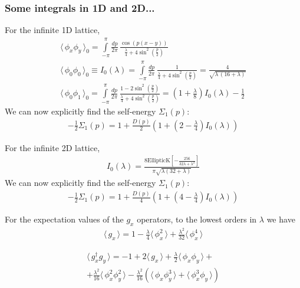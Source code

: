 \documentclass[12pt]{article}
\newcommand{\lr}[1]{ \left( #1 \right) }
\newcommand{\vev}[1]{ \langle \, #1 \, \rangle }
\begin{document}
\subsubsection{Some integrals in 1D and 2D...}

For the infinite 1D lattice,
\begin{eqnarray}
\label{phixphiy0}
 \vev{\phi_x \phi_y}_0 = \int\limits_{-\pi}^{\pi} \frac{d p}{2 \pi} \, \frac{\cos\lr{p\lr{x - y}}}{\frac{\lambda}{4} + 4 \sin^2\lr{\frac{p}{2}}}
 \nonumber \\
 \vev{\phi_0 \phi_0}_0 \equiv I_0\lr{\lambda} =  \int\limits_{-\pi}^{\pi} \frac{d p}{2 \pi} \, \frac{1}{\frac{\lambda}{4} + 4 \sin^2\lr{\frac{p}{2}}} = \frac{4}{\sqrt{\lambda \, \lr{16 + \lambda}}}
 \nonumber \\
 \vev{\phi_0 \phi_1}_0 =  \int\limits_{-\pi}^{\pi} \frac{d p}{2 \pi} \, \frac{1 - 2 \sin^2\lr{\frac{p}{2}}}{\frac{\lambda}{4} + 4 \sin^2\lr{\frac{p}{2}}} =
 \lr{1 + \frac{\lambda}{8}} I_0\lr{\lambda} - \frac{1}{2}
\end{eqnarray}
We can now explicitly find the self-energy $\Sigma_1\lr{p}$:
\begin{eqnarray}
\label{sigma1p}
 -\frac{1}{2} \Sigma_1\lr{p}
 =
 1 + \frac{D\lr{p}}{2}\lr{1 + \lr{2 - \frac{\lambda}{4}} I_0\lr{\lambda} }
\end{eqnarray}

For the infinite 2D lattice,
\begin{eqnarray}
\label{I0_2D}
 I_0\lr{\lambda} = \frac{8 \text{EllipticK}\left[-\frac{256}{32 \lambda +\lambda ^2}\right]}{\pi  \sqrt{\lambda  (32+\lambda )}}
\end{eqnarray}
We can now explicitly find the self-energy $\Sigma_1\lr{p}$:
\begin{eqnarray}
\label{sigma1p}
 -\frac{1}{2} \Sigma_1\lr{p}
 =
 1 + \frac{D\lr{p}}{4}\lr{1 + \lr{4 - \frac{\lambda}{4}} I_0\lr{\lambda} }
\end{eqnarray}

For the expectation values of the $g_x$ operators, to the lowest orders in $\lambda$ we have
\begin{eqnarray}
\label{gx_vev_lowest}
 \vev{g_x} = 1 - \frac{\lambda}{4} \vev{\phi_x^2} + \frac{\lambda^2}{32} \vev{\phi_x^4}
\end{eqnarray}

\begin{eqnarray}
\label{gxgy_vev_lowest}
 \vev{g^{\dag}_x g_y} =
 -1 + 2 \vev{g_x} + \frac{\lambda}{2} \vev{\phi_x \phi_y}
 + \nonumber \\ +
   \frac{\lambda^2}{16} \vev{\phi_x^2 \phi_y^2}
 - \frac{\lambda^2}{16} \lr{\vev{\phi_x \phi_y^3} + \vev{\phi_x^3 \phi_y}}
\end{eqnarray}
\end{document}
